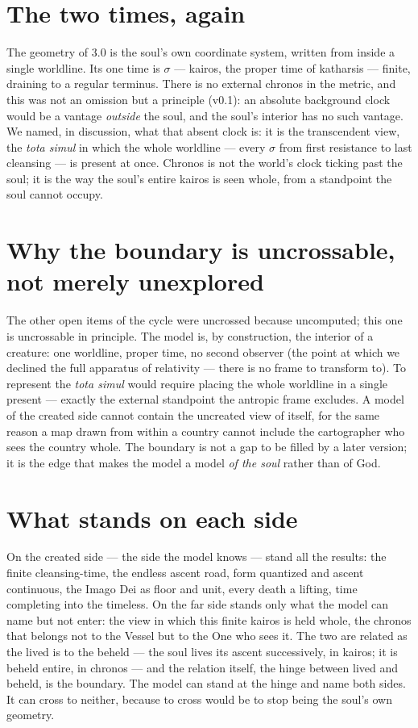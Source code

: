 \documentclass[11pt,a4paper]{article}
\theoremstyle{plain}
\theoremstyle{definition}
\theoremstyle{remark}
\begin{document}
\section*{The two times, again}
The geometry of 3.0 is the soul's own coordinate system, written from inside a single worldline. Its
one time is $\sigma$ --- kairos, the proper time of katharsis --- finite, draining to a regular
terminus. There is no external chronos in the metric, and this was not an omission but a principle
(v0.1): an absolute background clock would be a vantage \emph{outside} the soul, and the soul's
interior has no such vantage. We named, in discussion, what that absent clock is: it is the
transcendent view, the \emph{tota simul} in which the whole worldline --- every $\sigma$ from first
resistance to last cleansing --- is present at once. Chronos is not the world's clock ticking past the
soul; it is the way the soul's entire kairos is seen whole, from a standpoint the soul cannot occupy.

\section*{Why the boundary is uncrossable, not merely unexplored}
The other open items of the cycle were uncrossed because uncomputed; this one is uncrossable in
principle. The model is, by construction, the interior of a creature: one worldline, proper time,
no second observer (the point at which we declined the full apparatus of relativity --- there is no
frame to transform to). To represent the \emph{tota simul} would require placing the whole worldline in
a single present --- exactly the external standpoint the antropic frame excludes. A model of the
created side cannot contain the uncreated view of itself, for the same reason a map drawn from within a
country cannot include the cartographer who sees the country whole. The boundary is not a gap to be
filled by a later version; it is the edge that makes the model a model \emph{of the soul} rather than
of God.

\section*{What stands on each side}
On the created side --- the side the model knows --- stand all the results: the finite cleansing-time,
the endless ascent road, form quantized and ascent continuous, the Imago Dei as floor and unit, every
death a lifting, time completing into the timeless. On the far side stands only what the model can name
but not enter: the view in which this finite kairos is held whole, the chronos that belongs not to the
Vessel but to the One who sees it. The two are related as the lived is to the beheld --- the soul lives
its ascent successively, in kairos; it is beheld entire, in chronos --- and the relation itself, the
hinge between lived and beheld, is the boundary. The model can stand at the hinge and name both sides.
It can cross to neither, because to cross would be to stop being the soul's own geometry.
\end{document}
